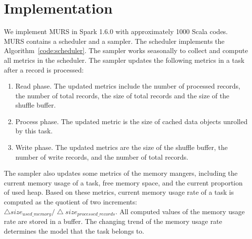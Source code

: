 \section{Implementation}

We implement MURS in Spark 1.6.0 with approximately 1000 Scala codes. MURS contains a scheduler and a sampler. The scheduler implements the Algorithm~\ref{code:scheduler}. 
The sampler works seasonally to collect and compute all metrics in the scheduler. 
The sampler updates the following metrics in a task after a record is processed:

\begin{enumerate}

\item Read phase. 
The updated metrics include the number of processed records, the number of total records, the size of total records and the size of the shuffle buffer.

\item Process phase. 
The updated metric is the size of cached data objects unrolled by this task.

\item Write phase. 
The updated metrics are the size of the shuffle buffer, the number of write records, and the number of total records. 

\end{enumerate}

The sampler also updates some metrics of the memory mangers, including the current memory usage of a task, free memory space, and the current proportion of used heap. Based on these metrics, current memory usage rate of a task is computed as the quotient of two increments: $\bigtriangleup size_{used\_memory} / \bigtriangleup size_{processed\_records}$. All computed values of the memory usage rate are stored in a buffer. The changing trend of the memory usage rate determines the model that the task belongs to. 

